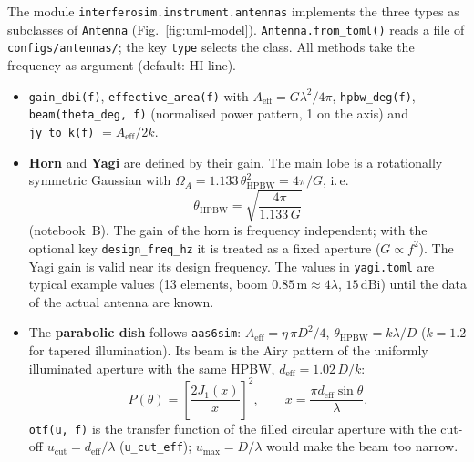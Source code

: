 The module \texttt{interferosim.instrument.antennas} implements the three
types as subclasses of \texttt{Antenna} (Fig.~\ref{fig:uml-model}).
\texttt{Antenna.from\_toml()} reads a file of \texttt{configs/antennas/};
the key \texttt{type} selects the class. All methods take the frequency
as argument (default: HI line).
\begin{itemize}
  \item \texttt{gain\_dbi(f)}, \texttt{effective\_area(f)} with
        $A_\mathrm{eff} = G\lambda^2/4\pi$, \texttt{hpbw\_deg(f)},
        \texttt{beam(theta\_deg, f)} (normalised power pattern, 1 on the
        axis) and \texttt{jy\_to\_k(f)} $= A_\mathrm{eff}/2k$.
  \item \textbf{Horn} and \textbf{Yagi} are defined by their gain. The
        main lobe is a rotationally symmetric Gaussian with
        $\Omega_A = 1.133\,\theta_\mathrm{HPBW}^2 = 4\pi/G$, i.\,e.\
        \begin{equation}
          \theta_\mathrm{HPBW} = \sqrt{\frac{4\pi}{1.133\,G}}
        \end{equation}
        (notebook~B). The gain of the horn is frequency independent; with
        the optional key \texttt{design\_freq\_hz} it is treated as a fixed
        aperture ($G\propto f^2$). The Yagi gain is valid near its design
        frequency. The values in \texttt{yagi.toml} are typical example
        values (13 elements, boom $0.85\,\mathrm{m}\approx 4\lambda$,
        $15\,\mathrm{dBi}$) until the data of the actual antenna are known.
  \item The \textbf{parabolic dish} follows \texttt{aas6sim}:
        $A_\mathrm{eff} = \eta\,\pi D^2/4$,
        $\theta_\mathrm{HPBW} = k\lambda/D$ ($k = 1.2$ for tapered
        illumination). Its beam is the Airy pattern of the uniformly
        illuminated aperture with the same HPBW,
        $d_\mathrm{eff} = 1.02\,D/k$:
        \begin{equation}
          P(\theta) = \left[\frac{2J_1(x)}{x}\right]^2,\qquad
          x = \frac{\pi d_\mathrm{eff}\sin\theta}{\lambda}.
        \end{equation}
        \texttt{otf(u, f)} is the transfer function of the filled circular
        aperture with the cut-off $u_\mathrm{cut} = d_\mathrm{eff}/\lambda$
        (\texttt{u\_cut\_eff}); $u_\mathrm{max} = D/\lambda$ would make the
        beam too narrow.
\end{itemize}

